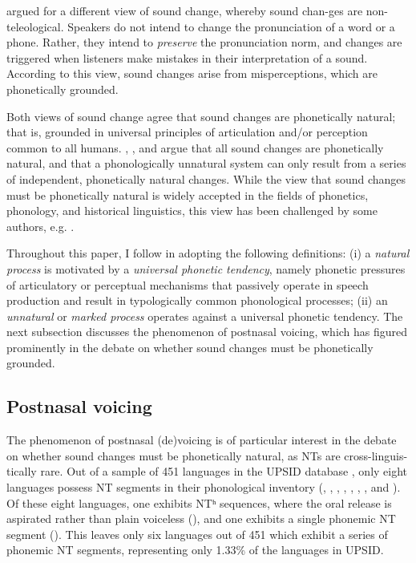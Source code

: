 \documentclass[output=paper,hidelinks]{langscibook}
\begin{document}
\citet{Ohala1993phonetics} argued for a different view of sound change, whereby sound chan-ges are non-teleological. Speakers do not intend to change the pronunciation of a word or a phone. Rather, they intend to \textit{preserve} the pronunciation norm, and changes are triggered when listeners make mistakes in their interpretation of a sound. According to this view, sound changes arise from misperceptions, which are phonetically grounded.

Both views of sound change agree that sound changes are phonetically natural; that is, grounded in universal principles of articulation and/or perception common to all humans. \citet{Hayes1999}, \citet{Hyman2001}, and \citet{Begus2019} argue that all sound changes are phonetically natural, and that a phonologically unnatural system can only result from a series of independent, phonetically natural changes. While the view that sound changes must be phonetically natural is widely accepted in the fields of phonetics, phonology, and historical linguistics, this view has been challenged by some authors, e.g. \citet{Blust2013}. 

Throughout this paper, I follow \citet{Begus2019} in adopting the following definitions: (i) a \textit{natural process} is motivated by a \textit{universal phonetic tendency}, namely phonetic pressures of articulatory or perceptual mechanisms that passively operate in speech production and result in typologically common phonological processes; (ii) an \textit{unnatural} or \textit{marked process} operates against a universal phonetic tendency. The next subsection discusses the phenomenon of postnasal voicing, which has figured prominently in the debate on whether sound changes must be phonetically grounded.

\subsection{Postnasal voicing}\label{sec:lapierre:1.2}

The phenomenon of postnasal (de)voicing is of particular interest in the debate on whether sound changes must be phonetically natural, as NTs are cross-linguis-tically rare. Out of a sample of 451 languages in the UPSID database \citep{maddieson1984}, only eight languages possess NT segments in their phonological inventory (, , , , , , , and ). Of these eight languages, one exhibits NTʰ sequences, where the oral release is aspirated rather than plain voiceless (), and one exhibits a single phonemic NT segment (). This leaves only six languages out of 451 which exhibit a series of phonemic NT segments, representing only 1.33\% of the languages in UPSID. 
\end{document}

